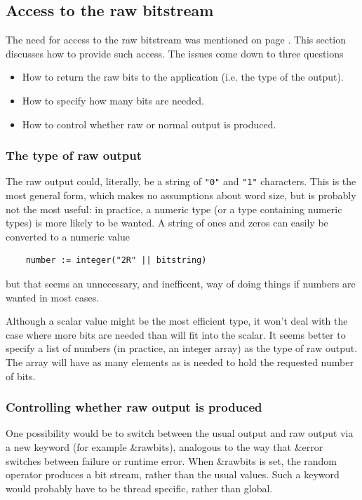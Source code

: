 \documentclass[letterpaper,12pt]{article}
\begin{document}
\subsection{Access to the raw bitstream}
The need for  access to the raw bitstream was mentioned on page
\pageref{rawBits}. This section discusses how to provide such access. The
issues come down to three questions
\begin{itemize}
\item How to return the raw bits to the application (i.e. the type of the
  output).
\item How to specify how many bits are needed.
\item How to control whether raw or normal output is produced.
\end{itemize}

\subsubsection{The type of raw output}
The raw output could, literally, be a string of \texttt{"0"} and \texttt{"1"}
characters. This is the most general form, which makes no assumptions about
word size, but is probably not the most useful: in practice, a numeric type
(or a type containing numeric types) is more likely to be wanted. A string of
ones and zeros can easily be converted to a numeric value
\begin{verbatim}
    number := integer("2R" || bitstring)
\end{verbatim}
but that seems an unnecessary, and inefficent, way of doing things if
numbers are wanted in most cases.

Although a scalar value might be the most efficient type, it won't deal
with the case where more bits are needed than will fit into the scalar. It
seems better to specify a list of numbers (in practice, an integer array)
as the type of raw output. The array will have as many elements as is
needed to hold the requested number of bits.

\subsubsection{Controlling whether raw output is produced}
One possibility would be to switch between the usual output and raw output
via a new keyword (for example {\sf \&rawbits}), analogous to the way that
{\sf \&error} switches between failure or runtime error.
When {\sf \&rawbits} is set, the random operator produces a bit stream,
rather than the usual values.  Such a keyword would probably have to be
thread specific, rather than global.
\end{document}
